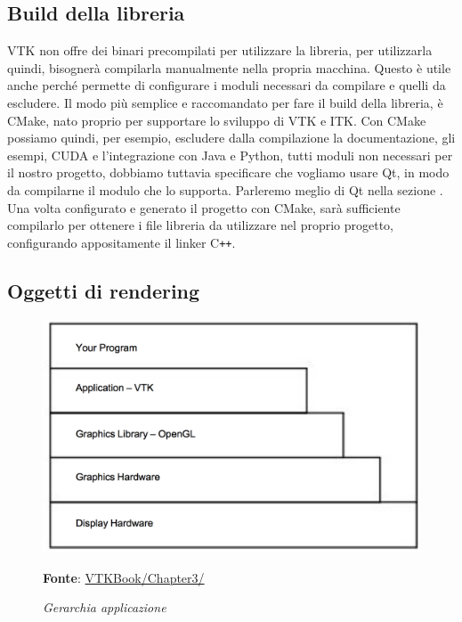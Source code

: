 \subsection{Build della libreria}\label{sec:build-liberia}
VTK non offre dei binari precompilati per utilizzare la libreria, per utilizzarla quindi, bisognerà compilarla manualmente nella propria macchina. Questo è utile anche perché permette di configurare i moduli necessari da compilare e quelli da escludere. Il modo più semplice e raccomandato per fare il build della libreria, è CMake, nato proprio per supportare lo sviluppo di VTK e ITK. Con CMake possiamo quindi, per esempio, escludere dalla compilazione la documentazione, gli esempi, CUDA e l'integrazione con Java e Python, tutti moduli non necessari per il nostro progetto, dobbiamo tuttavia specificare che vogliamo usare Qt, in modo da compilarne il modulo che lo supporta. Parleremo meglio di Qt nella sezione .\\
Una volta configurato e generato il progetto con CMake, sarà sufficiente compilarlo per ottenere i file libreria da utilizzare nel proprio progetto, configurando appositamente il linker C\texttt{++}.

\subsection{Oggetti di rendering}\label{sec:oggetti-rendering}
\begin{figure}[h]
    \centering
    \includegraphics[scale=0.4]{immagini/volumerendering/layers.png}
    \caption{\textit{Gerarchia applicazione}}
    \textbf{Fonte}: \href{https://lorensen.github.io/VTKExamples/site/VTKBook/03Chapter3/}{VTKBook/Chapter3/}
    \label{fig: vtk-layers}
\end{figure}

